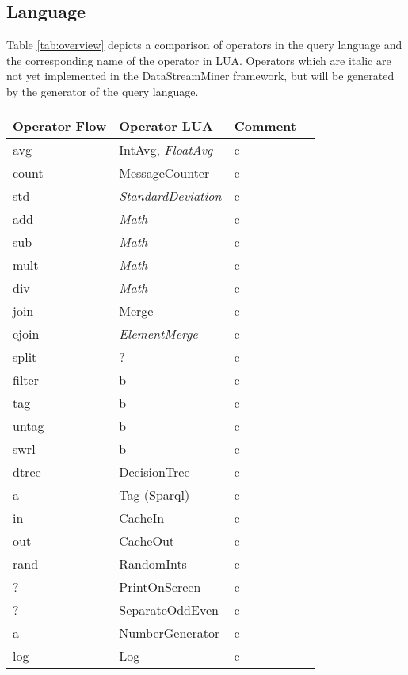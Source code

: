\subsection{Language}
Table \ref{tab:overview} depicts a comparison of operators in the query language
and the corresponding name of the operator in LUA. Operators which are italic 
are not yet implemented in the DataStreamMiner framework, but will be generated
by the generator of the query language.
\begin{center}
  \begin{tabular}{|l|l|l|l|}
  \hline 
  \textbf{Operator Flow} &  \textbf{Operator LUA} &  \textbf{Comment} \\
  \hline 
  \hline 
  avg & IntAvg, \textit{FloatAvg} & c \\
  \hline 
  count & MessageCounter & c \\
  \hline 
  std & \textit{StandardDeviation} & c \\
  \hline 
  add & \textit{Math} & c \\
  \hline 
  sub & \textit{Math} & c \\
  \hline 
  mult & \textit{Math} & c \\
  \hline 
  div & \textit{Math} & c \\
  \hline 
  join & Merge & c \\
  \hline 
  ejoin & \textit{ElementMerge} & c \\
  \hline
  split & ? & c \\
  \hline
  filter & b & c \\
  \hline
  tag & b & c \\
  \hline   
  untag & b & c \\
  \hline 
  swrl & b & c \\
  \hline
  dtree & DecisionTree & c \\
  \hline  
  a & Tag (Sparql) & c \\
  \hline 
  in & CacheIn & c \\
  \hline
  out & CacheOut & c \\
  \hline
  rand & RandomInts & c \\
  \hline
  ? & PrintOnScreen & c \\
  \hline  
  ? & SeparateOddEven & c \\
  \hline  
  a & NumberGenerator & c \\
  \hline  
  log & Log & c \\
  \hline
  \end{tabular}
  \label{tab:overview}
\end{center}

